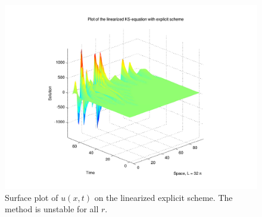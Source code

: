 \begin{figure}[H]
\centering
\includegraphics[scale=0.5]
{../PDFs/FE_Exp/linear_explicit.pdf}
\caption{Surface plot of $u(x,t)$ on the linearized explicit scheme. The method is unstable for all $r$.}
\label{fig:lin_exp}
\end{figure}







